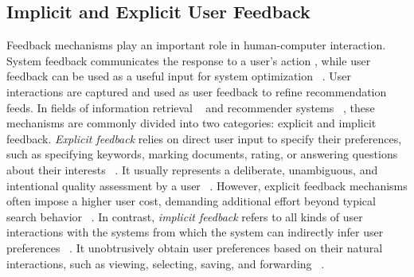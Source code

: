 \subsection{Implicit and Explicit User Feedback}
Feedback mechanisms play an important role in human-computer interaction. System feedback communicates the response to a user's action \cite{perez1996collaborative} , while user feedback can be used as a useful input for system optimization ~\cite{Spink/Losee:96}.  User interactions are captured and used as user feedback to refine recommendation feeds. In fields of information retrieval ~\cite{Spink/Losee:96} and recommender systems ~\cite{oard2001modeling}, these mechanisms are commonly divided into two categories: explicit and implicit feedback. \textit{Explicit feedback} relies on direct user input to specify their preferences, such as specifying keywords, marking documents, rating, or answering questions about their interests ~\cite{kelly2003implicit}. It usually represents a deliberate, unambiguous, and intentional quality assessment by a user ~\cite{jannach2018recommending}. However, explicit feedback mechanisms often impose a higher user cost, demanding additional effort beyond typical search behavior ~\cite{kelly2003implicit, gadanho2007addressing}. In contrast, \textit{implicit feedback} refers to all kinds of user interactions with the systems from which the system can indirectly infer user preferences ~\cite{jannach2018recommending}. It unobtrusively obtain user preferences based on their natural interactions, such as viewing, selecting, saving, and forwarding ~\cite{kelly2003implicit,jannach2018recommending}. 

